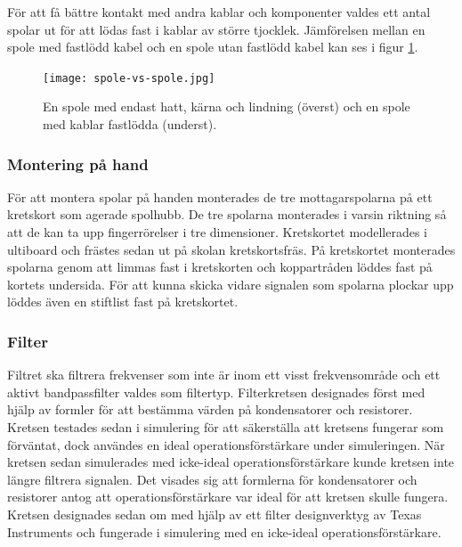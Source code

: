 \documentclass[a4paper]{article}
\begin{document}
\begin{sloppypar}
    För att få bättre kontakt med andra kablar och komponenter valdes ett antal spolar ut för att lödas fast i kablar av större tjocklek.
    Jämförelsen mellan en spole med fastlödd kabel och en spole utan fastlödd kabel kan ses i figur \ref{fig:SpoleVsSpole}.

    \begin{figure}[H]
        \centering
        \texttt{[image: spole-vs-spole.jpg]}
        \caption{En spole med endast hatt, kärna och lindning (överst) och en spole med kablar fastlödda (underst).}
        \label{fig:SpoleVsSpole}
    \end{figure}


    \subsubsection{Montering på hand} %
    För att montera spolar på handen monterades de tre mottagarspolarna på ett kretskort som agerade spolhubb.
    De tre spolarna monterades i varsin riktning så att de kan ta upp fingerrörelser i tre dimensioner.
    Kretskortet modellerades i ultiboard och frästes sedan ut på skolan kretskortsfräs.
    På kretskortet monterades spolarna genom att limmas fast i kretskorten och koppartråden löddes fast på kortets undersida.
    För att kunna skicka vidare signalen som spolarna plockar upp löddes även en stiftlist fast på kretskortet.


    \subsubsection{Filter}
    Filtret ska filtrera frekvenser som inte är inom ett visst frekvensområde och ett aktivt bandpassfilter valdes som filtertyp.
    Filterkretsen designades först med hjälp av formler för att bestämma värden på kondensatorer och resistorer.
    Kretsen testades sedan i simulering för att säkerställa att kretsens fungerar som förväntat,
    dock användes en ideal operationsförstärkare under simuleringen.
    När kretsen sedan simulerades med icke-ideal operationsförstärkare kunde kretsen inte längre filtrera signalen.
    Det visades sig att formlerna för kondensatorer och resistorer
    antog att operationsförstärkare var ideal för att kretsen skulle fungera.
    Kretsen designades sedan om med hjälp av ett filter designverktyg av Texas Instruments
    och fungerade i simulering med en icke-ideal operationsförstärkare.


\end{sloppypar}
\end{document}
